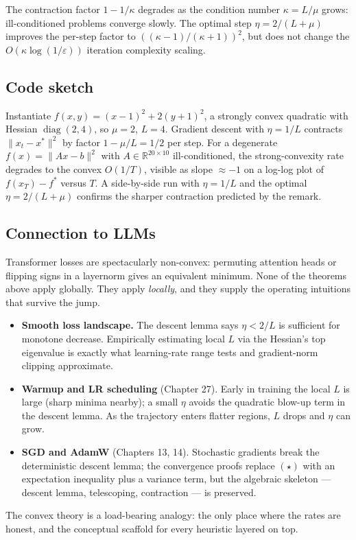 \begin{remark}
The contraction factor $1 - 1/\kappa$ degrades as the condition number $\kappa = L/\mu$ grows: ill-conditioned problems converge slowly. The optimal step $\eta = 2/(L + \mu)$ improves the per-step factor to $((\kappa - 1)/(\kappa + 1))^2$, but does not change the $O(\kappa \log(1/\varepsilon))$ iteration complexity scaling.
\end{remark}

\subsection*{Code sketch}

Instantiate $f(x, y) = (x-1)^2 + 2(y+1)^2$, a strongly convex quadratic with Hessian $\operatorname{diag}(2, 4)$, so $\mu = 2$, $L = 4$. Gradient descent with $\eta = 1/L$ contracts $\|x_t - x^*\|^2$ by factor $1 - \mu/L = 1/2$ per step. For a degenerate $f(x) = \|Ax - b\|^2$ with $A \in \mathbb{R}^{20 \times 10}$ ill-conditioned, the strong-convexity rate degrades to the convex $O(1/T)$, visible as slope $\approx -1$ on a log-log plot of $f(x_T) - f^*$ versus $T$. A side-by-side run with $\eta = 1/L$ and the optimal $\eta = 2/(L + \mu)$ confirms the sharper contraction predicted by the remark.

\subsection*{Connection to LLMs}

Transformer losses are spectacularly non-convex: permuting attention heads or flipping signs in a layernorm gives an equivalent minimum. None of the theorems above apply globally. They apply \emph{locally}, and they supply the operating intuitions that survive the jump.

\begin{itemize}
\item \textbf{Smooth loss landscape.} The descent lemma says $\eta < 2/L$ is sufficient for monotone decrease. Empirically estimating local $L$ via the Hessian's top eigenvalue is exactly what learning-rate range tests and gradient-norm clipping approximate.
\item \textbf{Warmup and LR scheduling} (Chapter 27). Early in training the local $L$ is large (sharp minima nearby); a small $\eta$ avoids the quadratic blow-up term in the descent lemma. As the trajectory enters flatter regions, $L$ drops and $\eta$ can grow.
\item \textbf{SGD and AdamW} (Chapters 13, 14). Stochastic gradients break the deterministic descent lemma; the convergence proofs replace $(\star)$ with an expectation inequality plus a variance term, but the algebraic skeleton --- descent lemma, telescoping, contraction --- is preserved.
\end{itemize}

The convex theory is a load-bearing analogy: the only place where the rates are honest, and the conceptual scaffold for every heuristic layered on top.

